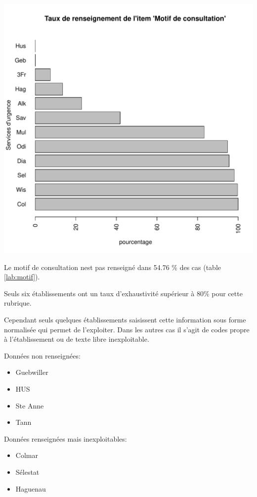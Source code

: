 \documentclass[12pt,english,french,twoside]{report}\usepackage[]{graphicx}\usepackage[]{color}
\makeatletter
\def\maxwidth{ %
  \ifdim\Gin@nat@width>\linewidth
    \linewidth
  \else
    \Gin@nat@width
  \fi
}
\makeatother
\begin{document}
\includegraphics[width=\maxwidth]{figure/motifss2} 



Le motif de consultation nest pas renseigné dans 54.76 \% des cas (table \ref{lab:motif}).

Seuls six établissements ont un taux d'exhaustivité supérieur à 80\% pour cette rubrique.

Cependant seuls quelques établissements saisissent cette information sous forme normalisée qui permet de l'exploiter. Dans les autres cas il s'agit de codes propre à l'établissement ou de texte libre inexploitable.

Données non renseignées:
\begin{itemize}
  \item Guebwiller
  \item HUS
  \item Ste Anne
  \item Tann
\end{itemize}

Données renseignées mais inexploitables:
\begin{itemize}
  \item Colmar
  \item Sélestat
  \item Haguenau
\end{itemize}
\end{document}
